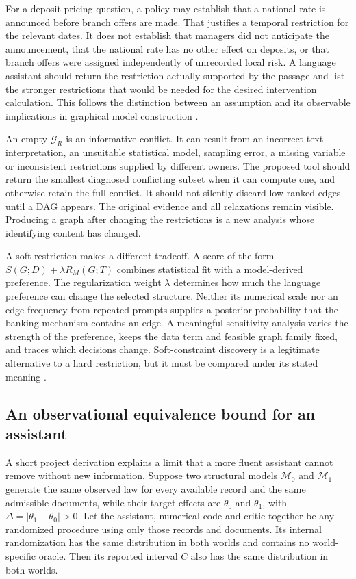 For a deposit-pricing question, a policy may establish that a national rate is
announced before branch offers are made. That justifies a temporal restriction
for the relevant dates. It does not establish that managers did not anticipate
the announcement, that the national rate has no other effect on deposits, or
that branch offers were assigned independently of unrecorded local risk. A
language assistant should return the restriction actually supported by the
passage and list the stronger restrictions that would be needed for the desired
intervention calculation. This follows the distinction between an assumption
and its observable implications in graphical model construction
\citep{exec13_census_credible}.

An empty $\mathcal G_R$ is an informative conflict. It can result from an
incorrect text interpretation, an unsuitable statistical model, sampling error,
a missing variable or inconsistent restrictions supplied by different owners.
The proposed tool should return the smallest diagnosed conflicting subset when
it can compute one, and otherwise retain the full conflict. It should not
silently discard low-ranked edges until a DAG appears. The original evidence
and all relaxations remain visible. Producing a graph after changing the
restrictions is a new analysis whose identifying content has changed.

A soft restriction makes a different tradeoff. A score of the form
$S(G;D)+\lambda R_M(G;T)$ combines statistical fit with a model-derived
preference. The regularization weight $\lambda$ determines how much the
language preference can change the selected structure. Neither its numerical
scale nor an edge frequency from repeated prompts supplies a posterior
probability that the banking mechanism contains an edge. A meaningful
sensitivity analysis varies the strength of the preference, keeps the data
term and feasible graph family fixed, and traces which decisions change.
Soft-constraint discovery is a legitimate alternative to a hard restriction,
but it must be compared under its stated meaning
\citep{v12_la_2405_13551,v12_la_2407_15073}.

\subsection{An observational equivalence bound for an assistant}

A short project derivation explains a limit that a more fluent assistant cannot
remove without new information. Suppose two structural models $\mathcal M_0$
and $\mathcal M_1$ generate the same observed law for every available record and
the same admissible documents, while their target effects are $\theta_0$ and
$\theta_1$, with $\Delta=|\theta_1-\theta_0|>0$. Let the assistant, numerical
code and critic together be any randomized procedure using only those records
and documents. Its internal randomization has the same distribution in both
worlds and contains no world-specific oracle. Then its reported interval $C$
also has the same distribution in both worlds.

